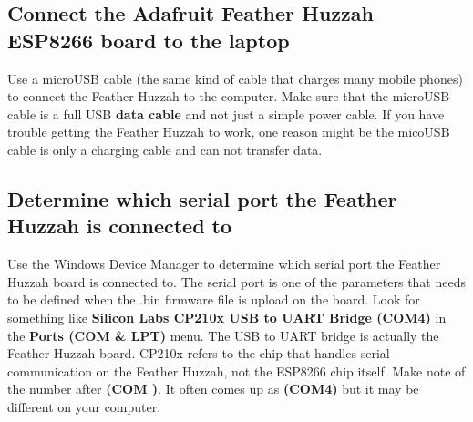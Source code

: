 \documentclass{book}
\begin{document}
    
        \subsection{Connect the Adafruit Feather Huzzah ESP8266 board to the
laptop}\label{connect-the-adafruit-feather-huzzah-esp8266-board-to-the-laptop}
    




    
        Use a microUSB cable (the same kind of cable that charges many mobile
phones) to connect the Feather Huzzah to the computer. Make sure that
the microUSB cable is a full USB \textbf{data cable} and not just a
simple power cable. If you have trouble getting the Feather Huzzah to
work, one reason might be the micoUSB cable is only a charging cable and
can not transfer data.
    




    
        \subsection{Determine which serial port the Feather Huzzah is connected
to}\label{determine-which-serial-port-the-feather-huzzah-is-connected-to}
    




    
        Use the Windows Device Manager to determine which serial port the
Feather Huzzah board is connected to. The serial port is one of the
parameters that needs to be defined when the .bin firmware file is
upload on the board. Look for something like \textbf{Silicon Labs CP210x
USB to UART Bridge (COM4)} in the \textbf{Ports (COM \& LPT)} menu. The
USB to UART bridge is actually the Feather Huzzah board. CP210x refers
to the chip that handles serial communication on the Feather Huzzah, not
the ESP8266 chip itself. Make note of the number after \textbf{(COM )}.
It often comes up as \textbf{(COM4)} but it may be different on your
computer.
\end{document}
